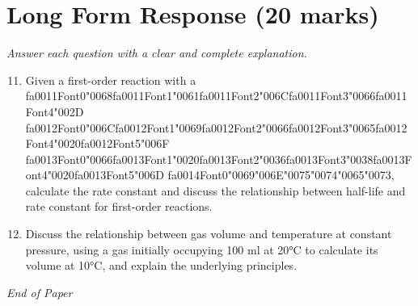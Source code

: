 \documentclass[12pt]{article}
\begin{document}
\section*{Long Form Response (20 marks)}
\textit{Answer each question with a clear and complete explanation.}
\begin{enumerate}[label=\arabic*.]
\setcounter{enumi}{10}
\item Given a first-order reaction with a {\csname fa0011Font0\endcsname\char"0068}{\csname fa0011Font1\endcsname\char"0061}{\csname fa0011Font2\endcsname\char"006C}{\csname fa0011Font3\endcsname\char"0066}{\csname fa0011Font4\endcsname\char"002D} {\csname fa0012Font0\endcsname\char"006C}{\csname fa0012Font1\endcsname\char"0069}{\csname fa0012Font2\endcsname\char"0066}{\csname fa0012Font3\endcsname\char"0065}{\csname fa0012Font4\endcsname\char"0020}{\csname fa0012Font5\endcsname\char"006F} {\csname fa0013Font0\endcsname\char"0066}{\csname fa0013Font1\endcsname\char"0020}{\csname fa0013Font2\endcsname\char"0036}{\csname fa0013Font3\endcsname\char"0038}{\csname fa0013Font4\endcsname\char"0020}{\csname fa0013Font5\endcsname\char"006D} {\csname fa0014Font0\endcsname\char"0069}{\char"006E}{\char"0075}{\char"0074}{\char"0065}{\char"0073}, calculate the rate constant
and discuss the relationship between half-life and rate constant for first-order
reactions.
\item Discuss the relationship between gas volume and temperature at constant pressure, using a
gas initially occupying 100 ml at 20°C to calculate its volume at 10°C, and explain the
underlying principles.
\end{enumerate}

\vfill
\noindent\textit{End of Paper}
\end{document}
